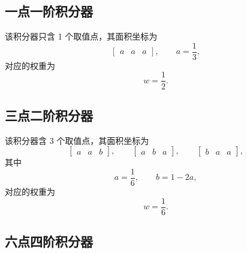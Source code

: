\subsection{一点一阶积分器}

该积分器只含 1 个取值点，其面积坐标为
\begin{equation}
\begin{bmatrix}a & a & a\end{bmatrix},\qquad a=\frac{1}{3},
\end{equation}
对应的权重为
\begin{equation}
w=\frac{1}{2}.
\end{equation}


\subsection{三点二阶积分器}

该积分器含 3 个取值点，其面积坐标为
\begin{equation}
\begin{bmatrix}a & a & b\end{bmatrix},\qquad\begin{bmatrix}a & b & a\end{bmatrix},\qquad\begin{bmatrix}b & a & a\end{bmatrix},
\end{equation}
其中
\begin{equation}
a=\frac{1}{6},\qquad b=1-2a,
\end{equation}
对应的权重为
\begin{equation}
w=\frac{1}{6}.
\end{equation}


\subsection{六点四阶积分器}

